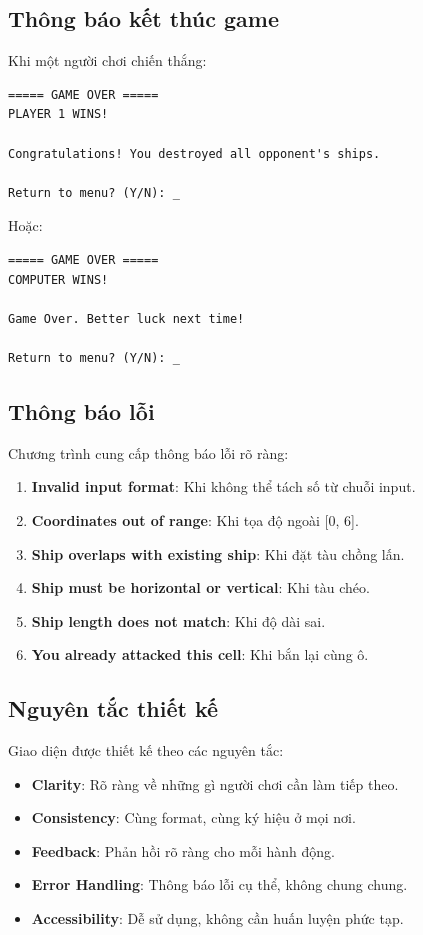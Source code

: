 \subsection{Thông báo kết thúc game}

Khi một người chơi chiến thắng:

\begin{verbatim}
===== GAME OVER =====
PLAYER 1 WINS!

Congratulations! You destroyed all opponent's ships.

Return to menu? (Y/N): _
\end{verbatim}

Hoặc:

\begin{verbatim}
===== GAME OVER =====
COMPUTER WINS!

Game Over. Better luck next time!

Return to menu? (Y/N): _
\end{verbatim}

\subsection{Thông báo lỗi}

Chương trình cung cấp thông báo lỗi rõ ràng:

\begin{enumerate}
    \item \textbf{Invalid input format}: Khi không thể tách số từ chuỗi input.
    \item \textbf{Coordinates out of range}: Khi tọa độ ngoài [0, 6].
    \item \textbf{Ship overlaps with existing ship}: Khi đặt tàu chồng lấn.
    \item \textbf{Ship must be horizontal or vertical}: Khi tàu chéo.
    \item \textbf{Ship length does not match}: Khi độ dài sai.
    \item \textbf{You already attacked this cell}: Khi bắn lại cùng ô.
\end{enumerate}

\subsection{Nguyên tắc thiết kế}

Giao diện được thiết kế theo các nguyên tắc:

\begin{itemize}
    \item \textbf{Clarity}: Rõ ràng về những gì người chơi cần làm tiếp theo.
    \item \textbf{Consistency}: Cùng format, cùng ký hiệu ở mọi nơi.
    \item \textbf{Feedback}: Phản hồi rõ ràng cho mỗi hành động.
    \item \textbf{Error Handling}: Thông báo lỗi cụ thể, không chung chung.
    \item \textbf{Accessibility}: Dễ sử dụng, không cần huấn luyện phức tạp.
\end{itemize}

